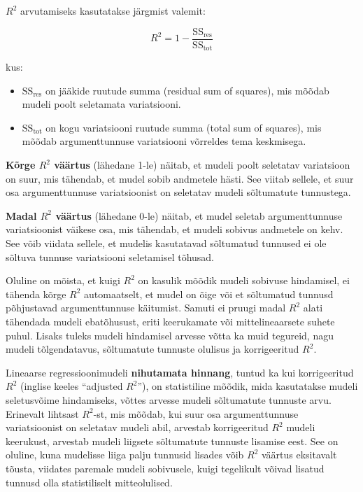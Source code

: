 \documentclass[
]{book}
\providecommand{\tightlist}{%
  \setlength{\itemsep}{0pt}\setlength{\parskip}{0pt}}
\begin{document}
\(R^2\) arvutamiseks kasutatakse järgmist valemit:

\[ R^2 = 1 - \frac{\text{SS}_\text{res}}{\text{SS}_\text{tot}} \]

kus:

\begin{itemize}
\tightlist
\item
  \(\text{SS}_\text{res}\) on jääkide ruutude summa (residual sum of squares), mis mõõdab mudeli poolt seletamata variatsiooni.
\item
  \(\text{SS}_\text{tot}\) on kogu variatsiooni ruutude summa (total sum of squares), mis mõõdab argumenttunnuse variatsiooni võrreldes tema keskmisega.
\end{itemize}

\textbf{Kõrge \(R^2\) väärtus} (lähedane 1-le) näitab, et mudeli poolt seletatav variatsioon on suur, mis tähendab, et mudel sobib andmetele hästi. See viitab sellele, et suur osa argumenttunnuse variatsioonist on seletatav mudeli sõltumatute tunnustega.

\textbf{Madal \(R^2\) väärtus} (lähedane 0-le) näitab, et mudel seletab argumenttunnuse variatsioonist väikese osa, mis tähendab, et mudeli sobivus andmetele on kehv. See võib viidata sellele, et mudelis kasutatavad sõltumatud tunnused ei ole sõltuva tunnuse variatsiooni seletamisel tõhusad.

Oluline on mõista, et kuigi \(R^2\) on kasulik mõõdik mudeli sobivuse hindamisel, ei tähenda kõrge \(R^2\) automaatselt, et mudel on õige või et sõltumatud tunnusd põhjustavad argumenttunnuse käitumist. Samuti ei pruugi madal \(R^2\) alati tähendada mudeli ebatõhusust, eriti keerukamate või mittelineaarsete suhete puhul. Lisaks tuleks mudeli hindamisel arvesse võtta ka muid tegureid, nagu mudeli tõlgendatavus, sõltumatute tunnuste olulisus ja korrigeeritud \(R^2\).

Lineaarse regressioonimudeli \textbf{nihutamata hinnang}, tuntud ka kui korrigeeritud \(R^2\) (inglise keeles ``adjusted \(R^2\)''), on statistiline mõõdik, mida kasutatakse mudeli seletusvõime hindamiseks, võttes arvesse mudeli sõltumatute tunnuste arvu. Erinevalt lihtsast \(R^2\)-st, mis mõõdab, kui suur osa argumenttunnuse variatsioonist on seletatav mudeli abil, arvestab korrigeeritud \(R^2\) mudeli keerukust, arvestab mudeli liigsete sõltumatute tunnuste lisamise eest. See on oluline, kuna mudelisse liiga palju tunnusid lisades võib \(R^2\) väärtus eksitavalt tõusta, viidates paremale mudeli sobivusele, kuigi tegelikult võivad lisatud tunnusd olla statistiliselt mitteolulised.
\end{document}
